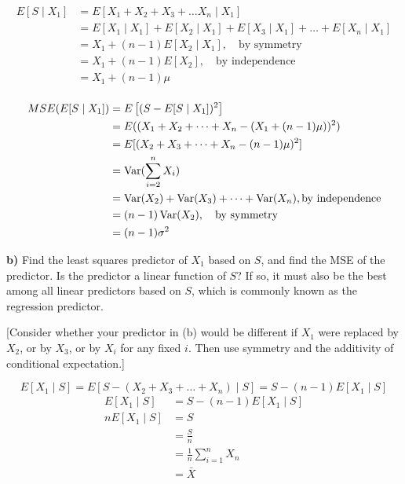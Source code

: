 \documentclass[11pt]{article}
\begin{document}
\begin{align*}
	E[S \mid X_{1}] &= E[X_1 + X_2 + X_3 + \dots X_{n} \mid X_{1}] \\
	&= E[X_1 \mid X_1] + E[X_2 \mid X_1] + E[X_3 \mid X_1] + \dots + E[X_{n} \mid X_1 ]  \\
	&= X_1 + (n-1)E[X_2 \mid X_1], \quad \text{by symmetry}\\ 
	&= X_1 + (n-1)E[X_2], \quad \text{by independence} \\
	&= X_{1} + (n-1)\mu  \\
\end{align*}

\begin{align*}
	MSE(E[S \mid X_{1}]) &= E\left[(S  - E[S \mid X_{1}])^{2}\right] \\
	&= E((X_1 + X_2 + \dots + X_n - (X_1 + (n-1)\mu ))^{2}) \\
	&= E[(X_2 + X_3 + \dots + X_{n} - (n-1)\mu )^{2}] \\ 
	&= \operatorname{Var}(\sum_{i=2}^{n} X_{i}) \\
	&= \operatorname{Var}(X_2) + \operatorname{Var}(X_3) + \dots + \operatorname{Var}(X_{n}), \text{by independence} \\
	&= (n-1)\operatorname{Var}(X_{2}), \quad \text{by symmetry} \\
	&= (n-1)\sigma^{2} \\
\end{align*}


\textbf{b)} Find the least squares predictor of \(X_1\) based on \(S\),
and find the MSE of the predictor. Is the predictor a linear function of
\(S\)? If so, it must also be the best among all linear predictors based
on \(S\), which is commonly known as the regression predictor.

{[}Consider whether your predictor in (b) would be different if \(X_1\)
were replaced by \(X_2\), or by \(X_3\), or by \(X_i\) for any fixed
\(i\). Then use symmetry and the additivity of conditional
expectation.{]}


\[
E[X_1 \mid S] = E[S - (X_2 + X_3 + \dots + X_{n})  \mid S] = S - (n-1)E[X_1 \mid S]
\]
\begin{align*}
	E[X_1 \mid S] &= S - (n-1)E[X_{1} \mid S] \\
	nE[X_1 \mid S] &= S\\
	&= \frac{S}{n} \\
	&= \frac{1}{n} \sum_{i=1}^{n} X_{n} \\
	&= \bar X \\
\end{align*}
\end{document}
